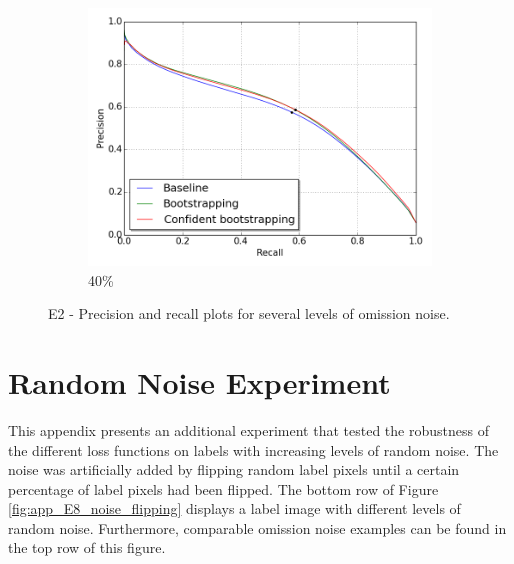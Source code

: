 \begin{figure}[H]
\begin{subfigure}{0.31\textwidth}
\end{subfigure}
\hspace*{\fill} %
\begin{subfigure}{0.31\textwidth}
\includegraphics[width=\textwidth]{figs/E2/pr_4.png}
\caption{40\%} \label{fig:app_E2_4_pr}
\vspace{-0.1cm} %
\end{subfigure}
\vspace{-0.6\baselineskip}
\caption[E2 - Precision and recall plots for several levels of omission noise]{E2 - Precision and recall plots for several levels of omission noise.} \label{fig:E2_all_pr}
\end{figure}

\section{Random Noise Experiment}
\label{app:randomnoiseexperiment}
This appendix presents an additional experiment that tested the robustness of the different loss functions on labels with increasing levels of random noise. The noise was artificially added by flipping random label pixels until a certain percentage of label pixels had been flipped. The bottom row of Figure \ref{fig:app_E8_noise_flipping} displays a label image with different levels of random noise. Furthermore, comparable omission noise examples can be found in the top row of this figure.\\


